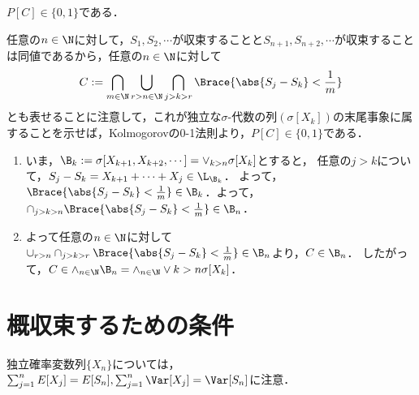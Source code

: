 \documentclass[uplatex,dvipdfmx]{jsreport}
\begin{document}
\begin{theorem}[独立確率変数の和は概収束するか概発散するかのいずれかである]\label{thm-convergence-of-sample-mean-belongs-to-tail-algebra}
    $P[C]\in\{0,1\}$である．
\end{theorem}
\begin{Proof}
    任意の$n\in\N$に対して，$S_1,S_2,\cdots$が収束することと$S_{n+1},S_{n+2},\cdots$が収束することは同値であるから，任意の$n\in\N$に対して
    \[C:=\bigcap_{m\in\N}\bigcup_{r>n\in\N}\bigcap_{j>k>r}\Brace{\abs{S_j-S_k}<\frac{1}{m}}\]
    とも表せることに注意して，これが独立な$\sigma$-代数の列$(\sigma[X_k])$の末尾事象に属することを示せば，Kolmogorovの0-1法則より，$P[C]\in\{0,1\}$である．
    \begin{enumerate}
        \item いま，$\B_k:=\sigma[X_{k+1},X_{k+2},\cdots]=\vee_{k>n}\sigma[X_k]$とすると，
        任意の$j>k$について，$S_j-S_k=X_{k+1}+\cdots +X_j\in\L_{\B_k}$．
        よって，$\Brace{\abs{S_j-S_k}<\frac{1}{m}}\in\B_k$．よって，$\cap_{j>k>n}\Brace{\abs{S_j-S_k}<\frac{1}{m}}\in\B_n$．
        \item よって任意の$n\in\N$に対して$\cup_{r>n}\cap_{j>k>r}\Brace{\abs{S_j-S_k}<\frac{1}{m}}\in\B_n$より，$C\in\B_n$．
        したがって，$C\in\wedge_{n\in\N}\B_n=\wedge_{n\in\N}\vee{k>n}\sigma[X_k]$．
    \end{enumerate}
\end{Proof}

\section{概収束するための条件}

\begin{tcolorbox}[colframe=ForestGreen, colback=ForestGreen!10!white,breakable,colbacktitle=ForestGreen!40!white,coltitle=black,fonttitle=\bfseries\sffamily,
title=]
    独立確率変数列$\{X_n\}$については，$\sum_{j=1}^nE[X_j]=E[S_n],\sum_{j=1}^n\Var[X_j]=\Var[S_n]$に注意．
\end{tcolorbox}
\end{document}
